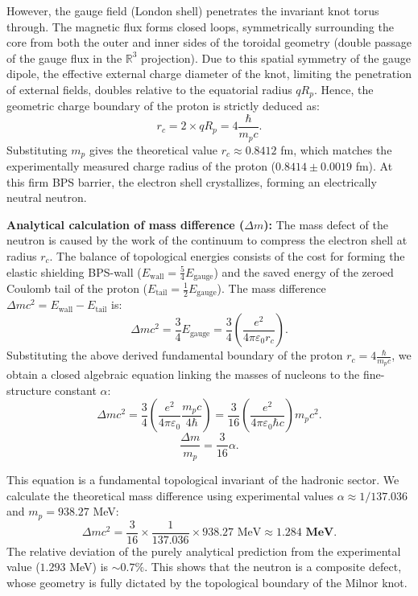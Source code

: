 \documentclass[11pt,a4paper]{article}
\begin{document}
	However, the gauge field (London shell) penetrates the invariant knot torus through. The magnetic flux forms closed loops, symmetrically surrounding the core from both the outer and inner sides of the toroidal geometry (double passage of the gauge flux in the $\mathbb{R}^3$ projection). Due to this spatial symmetry of the gauge dipole, the effective external charge diameter of the knot, limiting the penetration of external fields, doubles relative to the equatorial radius $q R_p$.
	Hence, the geometric charge boundary of the proton is strictly deduced as:
	\begin{equation}
		r_c = 2 \times q R_p = 4 \frac{\hbar}{m_p c}.
	\end{equation}
	Substituting $m_p$ gives the theoretical value $r_c \approx 0.8412$ fm, which matches the experimentally measured charge radius of the proton ($0.8414 \pm 0.0019$ fm). At this firm BPS barrier, the electron shell crystallizes, forming an electrically neutral neutron.
	
	\textbf{Analytical calculation of mass difference ($\Delta m$):}
	The mass defect of the neutron is caused by the work of the continuum to compress the electron shell at radius $r_c$. The balance of topological energies consists of the cost for forming the elastic shielding BPS-wall ($E_{\text{wall}} = \frac{5}{4} E_{\text{gauge}}$) and the saved energy of the zeroed Coulomb tail of the proton ($E_{\text{tail}} = \frac{1}{2} E_{\text{gauge}}$).
	The mass difference $\Delta m c^2 = E_{\text{wall}} - E_{\text{tail}}$ is:
	\begin{equation}
		\Delta m c^2 = \frac{3}{4} E_{\text{gauge}} = \frac{3}{4} \left( \frac{e^2}{4\pi\varepsilon_0 r_c} \right).
	\end{equation}
	Substituting the above derived fundamental boundary of the proton $r_c = 4 \frac{\hbar}{m_p c}$, we obtain a closed algebraic equation linking the masses of nucleons to the fine-structure constant $\alpha$:
	\begin{equation}
		\Delta m c^2 = \frac{3}{4} \left( \frac{e^2}{4\pi\varepsilon_0} \frac{m_p c}{4 \hbar} \right) = \frac{3}{16} \left( \frac{e^2}{4\pi\varepsilon_0 \hbar c} \right) m_p c^2.
	\end{equation}
	\begin{equation}
		\frac{\Delta m}{m_p} = \frac{3}{16} \alpha.
	\end{equation}
	
	This equation is a fundamental topological invariant of the hadronic sector. We calculate the theoretical mass difference using experimental values $\alpha \approx 1/137.036$ and $m_p = 938.27$ MeV:
	\begin{equation}
		\Delta m c^2 = \frac{3}{16} \times \frac{1}{137.036} \times 938.27 \text{ MeV} \approx \mathbf{1.284 \text{ MeV}}.
	\end{equation}
	The relative deviation of the purely analytical prediction from the experimental value ($1.293$ MeV) is $\sim 0.7\%$. This shows that the neutron is a composite defect, whose geometry is fully dictated by the topological boundary of the Milnor knot.
	
\end{document}
